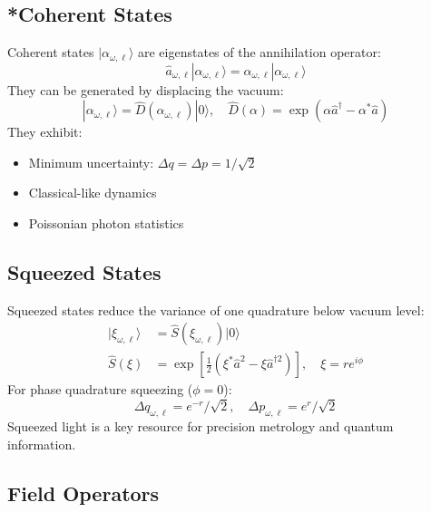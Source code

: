 \subsection{*Coherent States}

Coherent states $|\alpha_{\omega,\ell}\rangle$ are eigenstates of the annihilation operator:
\begin{equation}
\hat{a}_{\omega,\ell}|\alpha_{\omega,\ell}\rangle = \alpha_{\omega,\ell}|\alpha_{\omega,\ell}\rangle
\end{equation}
They can be generated by displacing the vacuum:
\begin{equation}
|\alpha_{\omega,\ell}\rangle = \hat{D}(\alpha_{\omega,\ell})|0\rangle, \quad \hat{D}(\alpha) = \exp(\alpha \hat{a}^\dagger - \alpha^* \hat{a})
\end{equation}
They exhibit:
\begin{itemize}
  \item Minimum uncertainty: $\Delta q = \Delta p = 1/\sqrt{2}$
  \item Classical-like dynamics
  \item Poissonian photon statistics
\end{itemize}

\subsection{Squeezed States}

Squeezed states reduce the variance of one quadrature below vacuum level:
\begin{align}
|\xi_{\omega,\ell}\rangle &= \hat{S}(\xi_{\omega,\ell}) |0\rangle \\
\hat{S}(\xi) &= \exp\left[\frac{1}{2}(\xi^* \hat{a}^2 - \xi \hat{a}^{\dagger 2})\right], \quad \xi = r e^{i\phi}
\end{align}
For phase quadrature squeezing ($\phi = 0$):
\begin{equation}
\Delta q_{\omega,\ell} = e^{-r}/\sqrt{2}, \quad \Delta p_{\omega,\ell} = e^{r}/\sqrt{2}
\end{equation}
Squeezed light is a key resource for precision metrology and quantum information.

\subsection{Field Operators}

